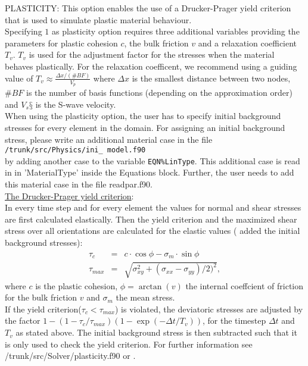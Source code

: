 \documentclass[12pt,twoside]{article}
\begin{document}
\noindent
\hypertarget{plast}{PLASTICITY}:
This option enables the use of a Drucker-Prager yield criterion that is used to simulate plastic material behaviour. \\
Specifying $1$ as plasticity option requires three additional variables providing the parameters for plastic cohesion $c$, the bulk friction $v$ and a relaxation coefficient $T_v$. $T_v$ is used for the adjustment factor for the stresses when the material behaves plastically. For the relaxation coefficent, we recommend using a guiding value of $T_v\approx \frac{\Delta x / (\# BF)}{V_p}$ where $\Delta x$ is the smallest distance between two nodes, $\# BF$ is the number of basis functions (depending on the approximation order) and $V_s§$ is the S-wave velocity. \\
When using the plasticity option, the user has to specify initial background stresses for every element in the domain.
For assigning an initial background stress, please write an additional material case in the file\\
 {\tt /trunk/src/Physics/ini\_ model.f90} \\
 by adding another case to the variable {\tt EQN\%LinType}. This additional case is read in in 'MaterialType' inside the Equations block. Further, the user needs to add this material case  in the file readpar.f90.\\
\noindent \uline{The Drucker-Prager yield criterion}: \\
In every time step and for every element the values for normal and shear stresses are first calculated elastically. Then the yield criterion and the maximized shear stress over all orientations are calculated for the elastic values ( added the initial background stresses):
\begin{eqnarray*}
\tau_c &=& c\cdot \cos \phi-\sigma_m\cdot \sin \phi \\
\tau_{max} &=& \sqrt{\sigma^2_{xy}+(\sigma_{xx}-\sigma_{yy})/2)^2},
\end{eqnarray*}
where $c$ is the plastic cohesion, $\phi=\arctan(v)$ the internal coeffcient of friction for the bulk friction $v$ and $\sigma_m$ the mean stress.\\
If the yield criterion($\tau_c < \tau_{max}$) is violated, the deviatoric stresses are adjusted by the factor $1-(1-\tau_c/\tau_{max})(1-\exp(-\Delta t /T_v))$, for the timestep $\Delta t$ and $T_v$ as stated above. The initial background stress is then subtracted such that it is only used to check the yield criterion.
For further information see /trunk/src/Solver/plasticity.f90 or \cite{Andrews2005}.
\end{document}
